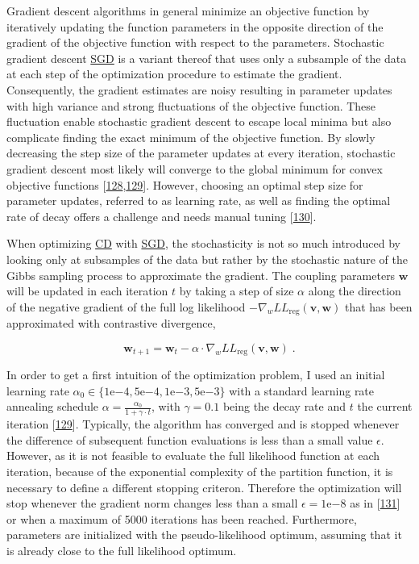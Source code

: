 \documentclass[12pt,a4paper,twoside]{book}
\newcommand{\LLreg}{L\!L_\mathrm{reg}}
\renewcommand{\v}{\mathbf{v}}
\newcommand{\w}{\mathbf{w}}
\theoremstyle{definition}
\theoremstyle{definition}
\theoremstyle{remark}
\begin{document}
Gradient descent algorithms in general minimize an objective function by
iteratively updating the function parameters in the opposite direction
of the gradient of the objective function with respect to the
parameters. Stochastic gradient descent \protect\hyperlink{abbrev}{SGD}
is a variant thereof that uses only a subsample of the data at each step
of the optimization procedure to estimate the gradient. Consequently,
the gradient estimates are noisy resulting in parameter updates with
high variance and strong fluctuations of the objective function. These
fluctuation enable stochastic gradient descent to escape local minima
but also complicate finding the exact minimum of the objective function.
By slowly decreasing the step size of the parameter updates at every
iteration, stochastic gradient descent most likely will converge to the
global minimum for convex objective functions
{[}\protect\hyperlink{ref-Ruder2017}{128},\protect\hyperlink{ref-Bottou2012}{129}{]}.
However, choosing an optimal step size for parameter updates, referred
to as learning rate, as well as finding the optimal rate of decay offers
a challenge and needs manual tuning
{[}\protect\hyperlink{ref-Schaul2013}{130}{]}.

When optimizing \protect\hyperlink{abbrev}{CD} with
\protect\hyperlink{abbrev}{SGD}, the stochasticity is not so much
introduced by looking only at subsamples of the data but rather by the
stochastic nature of the Gibbs sampling process to approximate the
gradient. The coupling parameters \(\w\) will be updated in each
iteration \(t\) by taking a step of size \(\alpha\) along the direction
of the negative gradient of the full log likelihood
\(- \nabla_w \LLreg(\v,\w)\) that has been approximated with contrastive
divergence,

\begin{equation}
  \w_{t+1} = \w_t - \alpha \cdot \nabla_w \LLreg(\v,\w) \; .
\end{equation}

In order to get a first intuition of the optimization problem, I used an
initial learning rate
\(\alpha_0 \in \{1\mathrm{e}{-4}, 5\mathrm{e}{-4}, 1\mathrm{e}{-3}, 5\mathrm{e}{-3}\}\)
with a standard learning rate annealing schedule
\(\alpha = \frac{\alpha_0}{1 + \gamma \cdot t}\), with \(\gamma=0.1\)
being the decay rate and \(t\) the current iteration
{[}\protect\hyperlink{ref-Bottou2012}{129}{]}. Typically, the algorithm
has converged and is stopped whenever the difference of subsequent
function evaluations is less than a small value \(\epsilon\). However,
as it is not feasible to evaluate the full likelihood function at each
iteration, because of the exponential complexity of the partition
function, it is necessary to define a different stopping criteron.
Therefore the optimization will stop whenever the gradient norm changes
less than a small \(\epsilon=1\mathrm{e}{-8}\) as in
{[}\protect\hyperlink{ref-Carreira-Perpinan2005}{131}{]} or when a
maximum of 5000 iterations has been reached. Furthermore, parameters are
initialized with the pseudo-likelihood optimum, assuming that it is
already close to the full likelihood optimum.
\end{document}
